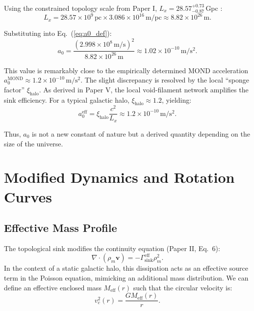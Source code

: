 \documentclass[12pt,a4paper]{article}
\begin{document}
Using the constrained topology scale from Paper I, $L_x = 28.57^{+0.73}_{-0.87}$\,Gpc \citep{Logvinovich2026a}:
\begin{equation}
L_x = 28.57 \times 10^9\,\mathrm{pc} \times 3.086 \times 10^{16}\,\mathrm{m/pc} \approx 8.82 \times 10^{26}\,\mathrm{m}.
\end{equation}

Substituting into Eq.~(\ref{eq:a0_def}):
\begin{equation}
a_0 = \frac{(2.998 \times 10^8\,\mathrm{m/s})^2}{8.82 \times 10^{26}\,\mathrm{m}} \approx 1.02 \times 10^{-10}\,\mathrm{m/s^2}.
\end{equation}

This value is remarkably close to the empirically determined MOND acceleration $a_0^{\mathrm{MOND}} \approx 1.2 \times 10^{-10}\,\mathrm{m/s^2}$. The slight discrepancy is resolved by the local ``sponge factor'' $\xi_{\mathrm{halo}}$. As derived in Paper V, the local void-filament network amplifies the sink efficiency. For a typical galactic halo, $\xi_{\mathrm{halo}} \approx 1.2$, yielding:
\begin{equation}
a_0^{\mathrm{eff}} = \xi_{\mathrm{halo}} \frac{c^2}{L_x} \approx 1.2 \times 10^{-10}\,\mathrm{m/s^2}.
\end{equation}

Thus, $a_0$ is not a new constant of nature but a derived quantity depending on the size of the universe.

\section{Modified Dynamics and Rotation Curves}

\subsection{Effective Mass Profile}

The topological sink modifies the continuity equation (Paper II, Eq.~6):
\begin{equation}
\nabla \cdot (\rho_m \mathbf{v}) = -\Gamma_{\mathrm{sink}}^{\mathrm{eff}} \rho_m^2.
\end{equation}
In the context of a static galactic halo, this dissipation acts as an effective source term in the Poisson equation, mimicking an additional mass distribution. We can define an effective enclosed mass $M_{\mathrm{eff}}(r)$ such that the circular velocity is:
\begin{equation}
v_c^2(r) = \frac{G M_{\mathrm{eff}}(r)}{r}.
\end{equation}
\end{document}
